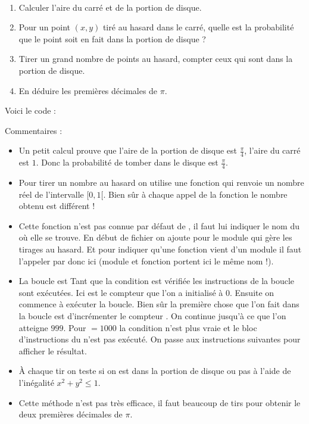 \documentclass[class=report,crop=false]{standalone}
\begin{document}
\begin{tp}~
\begin{enumerate}
  \item Calculer l'aire du carré et de la portion de disque.
  \item Pour un point $(x,y)$ tiré au hasard dans le carré, quelle est la probabilité que le point soit en fait dans la portion de disque ?
  \item Tirer un grand nombre de points au hasard, compter ceux qui sont dans la portion de disque.
  \item En déduire les premières décimales de $\pi$.
\end{enumerate}
\end{tp}


Voici le code :

Commentaires :
\begin{itemize}
  \item Un petit calcul prouve que l'aire de la portion de disque est $\frac{\pi}{4}$, l'aire du carré est $1$.
  Donc la probabilité de tomber dans le disque est $\frac{\pi}{4}$.

  \item Pour tirer un nombre au hasard on utilise une fonction  qui renvoie un nombre réel
  de l'intervalle $[0,1[$.   Bien sûr à chaque appel de la fonction  le nombre obtenu est différent !

  \item Cette fonction n'est pas connue par défaut de \Python, il faut lui indiquer le nom du  où elle se trouve.
  En début de fichier on ajoute  pour le module qui gère les tirages au hasard. Et pour indiquer
  qu'une fonction vient d'un module il faut l’appeler par  donc ici 
  (module et fonction portent ici le même nom !).

  \item La boucle est  Tant que la condition est vérifiée
  les instructions de la boucle sont exécutées.
  Ici  est le compteur que l'on a initialisé à $0$. Ensuite on commence à exécuter la boucle.
  Bien sûr la première chose que l'on fait dans la boucle est d'incrémenter le compteur . On continue
  jusqu'à ce que l'on atteigne $999$. Pour $=1000$ la condition
  n'est plus vraie et le bloc d'instructions du  n'est pas exécuté. On passe aux instructions suivantes
  pour afficher le résultat.

  \item \`A chaque tir on teste si on est dans la portion de disque ou pas à l'aide de l'inégalité $x^2+y^2 \le 1$.

  \item Cette méthode n'est pas très efficace, il faut beaucoup de tirs pour obtenir le deux premières décimales de $\pi$.
\end{itemize}
\end{document}

